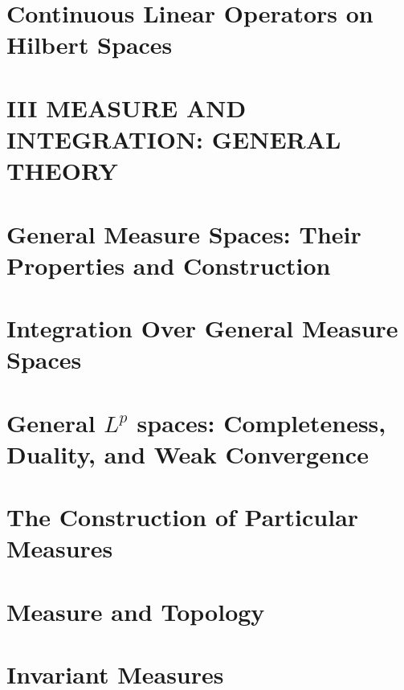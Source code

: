 \documentclass[a4paper,10pt]{book}
\theoremstyle{plain} %
\begin{document}
\chapter{Continuous Linear Operators on Hilbert Spaces}

\setcounter{chapter}{0}
\chapter*{III MEASURE AND INTEGRATION: GENERAL THEORY} 
\setcounter{chapter}{16}

\chapter{General Measure Spaces: Their Properties and Construction}
\chapter{Integration Over General Measure Spaces}
\chapter{General $L^p$ spaces: Completeness, Duality, and Weak Convergence}
\chapter{The Construction of Particular Measures}
\chapter{Measure and Topology}
\chapter{Invariant Measures}
\end{document}
